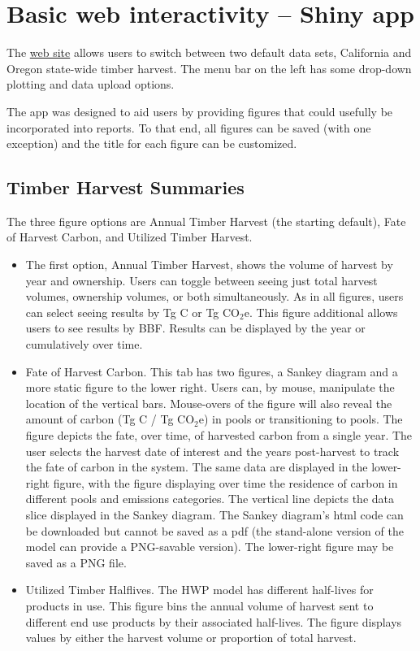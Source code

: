 \documentclass[
]{book}
\begin{document}
\hypertarget{run-shiny}{%
\section{Basic web interactivity -- Shiny app}\label{run-shiny}}

The \href{https://groomanalyticsllc.shinyapps.io/HWP_Shared_Test/}{web site} allows users to switch between two default data sets, California and Oregon state-wide timber harvest. The menu bar on the left has some drop-down plotting and data upload options.

The app was designed to aid users by providing figures that could usefully be incorporated into reports. To that end, all figures can be saved (with one exception) and the title for each figure can be customized.

\hypertarget{run-shiny-timber}{%
\subsection{Timber Harvest Summaries}\label{run-shiny-timber}}

The three figure options are Annual Timber Harvest (the starting default), Fate of Harvest Carbon, and Utilized Timber Harvest.

\begin{itemize}
\item
  The first option, Annual Timber Harvest, shows the volume of harvest by year and ownership. Users can toggle between seeing just total harvest volumes, ownership volumes, or both simultaneously. As in all figures, users can select seeing results by Tg C or Tg CO\(_2\)e. This figure additional allows users to see results by BBF. Results can be displayed by the year or cumulatively over time.
\item
  Fate of Harvest Carbon. This tab has two figures, a Sankey diagram and a more static figure to the lower right. Users can, by mouse, manipulate the location of the vertical bars. Mouse-overs of the figure will also reveal the amount of carbon (Tg C / Tg CO\(_2\)e) in pools or transitioning to pools. The figure depicts the fate, over time, of harvested carbon from a single year. The user selects the harvest date of interest and the years post-harvest to track the fate of carbon in the system. The same data are displayed in the lower-right figure, with the figure displaying over time the residence of carbon in different pools and emissions categories. The vertical line depicts the data slice displayed in the Sankey diagram. The Sankey diagram's html code can be downloaded but cannot be saved as a pdf (the stand-alone version of the model can provide a PNG-savable version). The lower-right figure may be saved as a PNG file.
\item
  Utilized Timber Halflives. The HWP model has different half-lives for products in use. This figure bins the annual volume of harvest sent to different end use products by their associated half-lives. The figure displays values by either the harvest volume or proportion of total harvest.
\end{itemize}
\end{document}
